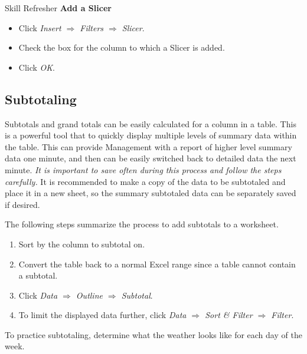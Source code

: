 \begin{center}
	\begin{sklbox}{Skill Refresher}
		\textbf{Add a Slicer}
		\\
		\begin{itemize}
			\setlength{\itemsep}{0pt}
			\setlength{\parskip}{0pt}
			\setlength{\parsep}{0pt}

			\item Click \textit{Insert $ \Rightarrow $ Filters $ \Rightarrow $ Slicer}.
			\item Check the box for the column to which a Slicer is added.
			\item Click \textit{OK}.
			
		\end{itemize}
	\end{sklbox}
\end{center}

\subsection{Subtotaling}

Subtotals and grand totals can be easily calculated for a column in a table. This is a powerful tool that to quickly display multiple levels of summary data within the table. This can provide Management with a report of higher level summary data one minute, and then can be easily switched back to detailed data the next minute. \textit{It is important to save often during this process and follow the steps carefully.} It is recommended to make a copy of the data to be subtotaled and place it in a new sheet, so the summary subtotaled data can be separately saved if desired.

The following steps summarize the process to add subtotals to a worksheet.

\begin{enumerate}
	\item Sort by the column to subtotal on.
	\item Convert the table back to a normal Excel range since a table cannot contain a subtotal.
	\item Click \textit{Data $ \Rightarrow $ Outline $ \Rightarrow $ Subtotal}.
	\item To limit the displayed data further, click \textit{Data $ \Rightarrow $ Sort \& Filter $ \Rightarrow $ Filter}.
\end{enumerate}

To practice subtotaling, determine what the weather looks like for each day of the week.

